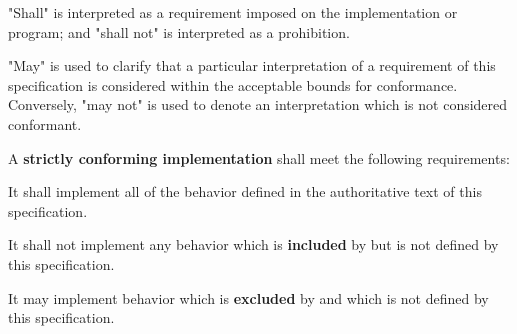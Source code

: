 
\specitem
"Shall" is interpreted as a requirement imposed on the implementation or
program; and "shall not" is interpreted as a prohibition.

\specitem
"May" is used to clarify that a particular interpretation of a requirement of
this specification is considered within the acceptable bounds for conformance.
Conversely, "may not" is used to denote an interpretation which is not
considered conformant.

\specitem
A \textbf{strictly conforming implementation} shall meet the following
requirements:

\specsubitem
It shall implement all of the behavior defined in the authoritative text of this
specification.

\specsubitem
It shall not implement any behavior which is \textbf{included} by
 but is not defined by this specification.


\specsubitem
It may implement behavior which is \textbf{excluded} by  and
which is not defined by this specification.
